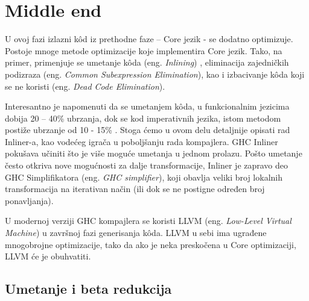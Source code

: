 \section{Middle end}
\label{sec:middle}

U ovoj fazi izlazni k\^{o}d iz prethodne faze – Core jezik - se dodatno optimizuje. Postoje mnoge metode optimizacije koje implementira Core jezik. Tako, na primer, primenjuje se umetanje k\^{o}da (eng. \emph{Inlining}) \cite{inliner}, eliminacija zajedničkih podizraza (eng. \emph{Common Subexpression Elimination}), kao i izbacivanje k\^{o}da koji se ne koristi (eng. \emph{Dead Code Elimination}).

Interesantno je napomenuti da se umetanjem k\^{o}da, u funkcionalnim jezicima dobija 20 – 40\% ubrzanja, dok se kod imperativnih jezika, istom metodom postiže ubrzanje od 10 - 15\% \cite{Cinliner}. Stoga ćemo u ovom delu detaljnije opisati rad Inliner-a, kao vodećeg igrača u poboljšanju rada kompajlera. GHC Inliner pokušava učiniti što je više moguće umetanja u jednom prolazu. Pošto umetanje često otkriva nove mogućnosti za dalje transformacije, Inliner je zapravo deo GHC Simplifikatora (eng. \emph{GHC simplifier}), koji obavlja veliki broj lokalnih transformacija na iterativan način (ili dok se ne postigne određen broj ponavljanja).

U modernoj verziji GHC kompajlera se koristi LLVM (eng. \emph{Low-Level Virtual Machine}) u završnoj fazi generisanja k\^{o}da. LLVM u sebi ima ugrađene mnogobrojne optimizacije, tako da ako je neka preskočena u Core optimizaciji, LLVM će je obuhvatiti.

\subsection{Umetanje i beta redukcija}
\label{subsec:podnaslovInlineBeta}

